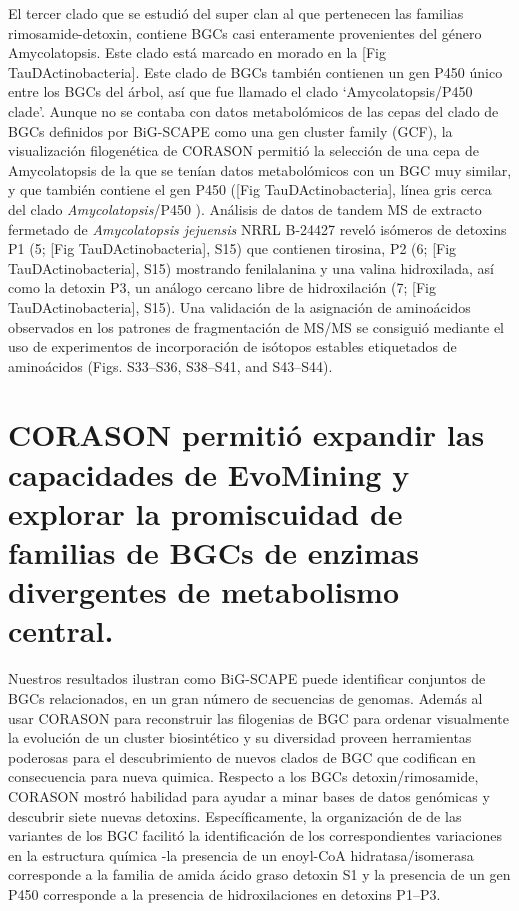 \documentclass[12pt,twoside]{reedthesis}
\begin{document}
  El tercer clado que se estudió del super clan al que pertenecen las
  familias rimosamide-detoxin, contiene BGCs casi enteramente provenientes
  del género Amycolatopsis. Este clado está marcado en morado en la {[}Fig
  TauDActinobacteria{]}. Este clado de BGCs también contienen un gen P450
  único entre los BGCs del árbol, así que fue llamado el clado
  `Amycolatopsis/P450 clade'. Aunque no se contaba con datos metabolómicos
  de las cepas del clado de BGCs definidos por BiG-SCAPE como una gen
  cluster family (GCF), la visualización filogenética de CORASON permitió
  la selección de una cepa de Amycolatopsis de la que se tenían datos
  metabolómicos con un BGC muy similar, y que también contiene el gen P450
  ({[}Fig TauDActinobacteria{]}, línea gris cerca del clado
  \emph{Amycolatopsis}/P450 ). Análisis de datos de tandem MS de extracto
  fermetado de \emph{Amycolatopsis jejuensis} NRRL B-24427 reveló isómeros
  de detoxins P1 (5; {[}Fig TauDActinobacteria{]}, S15) que contienen
  tirosina, P2 (6; {[}Fig TauDActinobacteria{]}, S15) mostrando
  fenilalanina y una valina hidroxilada, así como la detoxin P3, un
  análogo cercano libre de hidroxilación (7; {[}Fig TauDActinobacteria{]},
  S15). Una validación de la asignación de aminoácidos observados en los
  patrones de fragmentación de MS/MS se consiguió mediante el uso de
  experimentos de incorporación de isótopos estables etiquetados de
  aminoácidos (Figs. S33--S36, S38--S41, and S43--S44).
  
  \section{CORASON permitió expandir las capacidades de EvoMining y
  explorar la promiscuidad de familias de BGCs de enzimas divergentes de
  metabolismo
  central.}\label{corason-permitio-expandir-las-capacidades-de-evomining-y-explorar-la-promiscuidad-de-familias-de-bgcs-de-enzimas-divergentes-de-metabolismo-central.}
  
  Nuestros resultados ilustran como BiG-SCAPE puede identificar conjuntos
  de BGCs relacionados, en un gran número de secuencias de genomas. Además
  al usar CORASON para reconstruir las filogenias de BGC para ordenar
  visualmente la evolución de un cluster biosintético y su diversidad
  proveen herramientas poderosas para el descubrimiento de nuevos clados
  de BGC que codifican en consecuencia para nueva quimica. Respecto a los
  BGCs detoxin/rimosamide, CORASON mostró habilidad para ayudar a minar
  bases de datos genómicas y descubrir siete nuevas detoxins.
  Específicamente, la organización de de las variantes de los BGC facilitó
  la identificación de los correspondientes variaciones en la estructura
  química -la presencia de un enoyl-CoA hidratasa/isomerasa corresponde a
  la familia de amida ácido graso detoxin S1 y la presencia de un gen P450
  corresponde a la presencia de hidroxilaciones en detoxins P1--P3.
  
\end{document}
